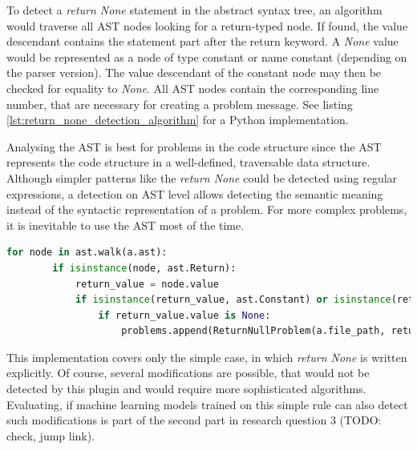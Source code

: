 \begin{description}
    To detect a \textit{return None} statement in the abstract syntax tree, an algorithm would traverse all AST nodes looking for a return-typed node. If found, the value descendant contains the statement part after the return keyword. A \textit{None} value would be represented as a node of type constant or name constant (depending on the parser version). The value descendant of the constant node may then be checked for equality to \textit{None}. All AST nodes contain the corresponding line number, that are necessary for creating a problem message. See listing \ref{lst:return_none_detection_algorithm} for a Python implementation. 


    Analysing the AST is best for problems in the code structure since the AST represents the code structure in a well-defined, traversable data structure. Although simpler patterns like the \textit{return None} could be detected using regular expressions, a detection on AST level allows detecting the semantic meaning instead of the syntactic representation of a problem. For more complex problems, it is inevitable to use the AST most of the time.
\end{description}

\begin{minipage}[c]{\linewidth}
    \begin{lstlisting}[language=Python, label=lst:return_none_detection_algorithm, caption={Detecting RETURN NONE problems by analsing the AST data structure.}]
    for node in ast.walk(a.ast):
        if isinstance(node, ast.Return):
            return_value = node.value
            if isinstance(return_value, ast.Constant) or isinstance(return_value, ast.NameConstant):
                if return_value.value is None:
                    problems.append(ReturnNullProblem(a.file_path, return_value.lineno))\end{lstlisting}
    \end{minipage}

This implementation covers only the simple case, in which \textit{return None} is written explicitly. Of course, several modifications are possible, that would not be detected by this plugin and would require more sophisticated algorithms. Evaluating, if machine learning models trained on this simple rule can also detect such modifications is part of the second part in research question 3 (TODO: check, jump link).

